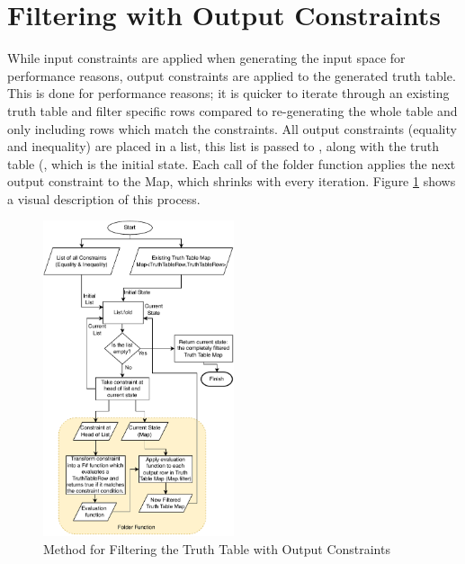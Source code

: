 

\section{Filtering with Output Constraints}
While input constraints are applied when generating the input space for performance reasons, output constraints are applied to the generated truth table. This is done for performance reasons; it is quicker to iterate through an existing truth table and filter specific rows compared to re-generating the whole table and only including rows which match the constraints. All output constraints (equality and inequality) are placed in a list, this list is passed to , along with the truth table (, which is the initial state. Each call of the folder function applies the next output constraint to the Map, which shrinks with every iteration. Figure \ref{fig:outputconsfilter} shows a visual description of this process.

\begin{figure}
    \centering
    \includegraphics[width=0.5\textwidth]{05.ImpPlan/outputconstraints.pdf}
    \caption{Method for Filtering the Truth Table with Output Constraints}
    \label{fig:outputconsfilter}
\end{figure}

